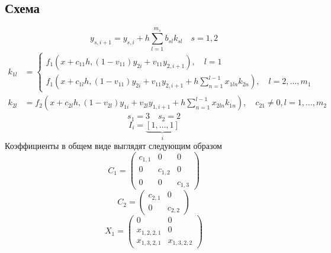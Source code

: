 \documentclass[a4paper,article,14pt]{extarticle}
\begin{document}
\subsection{Схема}
\begin{equation}
    y_{s,i+1} = y_{s,i} + h \sum_{l=1}^{m_{s}} b_{sl} k_{sl} \quad s = 1, 2
    \label{eq:method}
\end{equation}
\begin{equation}
\begin{aligned}
    k_{1l} &= 
\begin{cases}
    f_{1}(x + c_{11} h, (1 - v_{11}) y_{2i} + v_{11} y_{2,i+1}), \quad l = 1 \\
    f_{1}(x + c_{1l} h, (1 - v_{11}) y_{2i} + v_{11} y_{2,i+1} + h \sum_{n=1}^{l-1} x_{1ln} k_{2n}), \quad l = 2, \dotsc, m_{1}
\end{cases}
    \\k_{2l} &= 
    f_{2}(x + c_{2l} h, (1 - v_{2l}) y_{1i} + v_{2l} y_{1,i+1} + h \sum_{n=1}^{l-1} x_{2ln} k_{1n}), \quad c_{21} \not= 0, l = 1, \dotsc, m_{2}
\end{aligned}
\end{equation}
\begin{equation}
    s_{1} = 3 \quad s_{2} = 2
\end{equation}
\begin{equation}
I_{i} = \underbrace{\left[
    1, \dotsc, 1
    \right]}_{i}
\end{equation}
Коэффициенты в общем виде выглядят следующим образом
\begin{equation}
C_{1} =
\begin{pmatrix}
    c_{1,1} & 0 & 0 \\
    0 & c_{1,2} & 0 \\
    0 & 0 & c_{1,3}
\end{pmatrix}
\end{equation}
\begin{equation}
C_{2} =
\begin{pmatrix}
    c_{2,1} & 0 \\
    0 & c_{2,2}
\end{pmatrix}
\end{equation}
\begin{equation}
X_{1} = 
\begin{pmatrix}
    0 & 0 \\
    x_{1,2,2,1} & 0 \\
    x_{1,3,2,1} & x_{1,3,2,2}
\end{pmatrix}
\end{equation}
\end{document}
